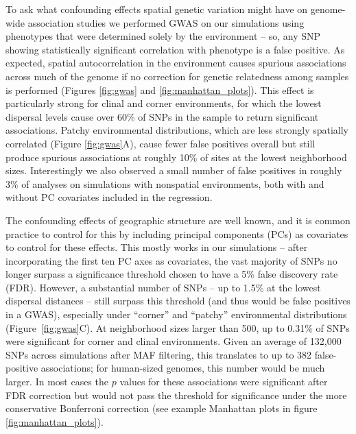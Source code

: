 \documentclass[10pt,twoside,lineno,hidelinks]{preprint}
\begin{document}
To ask what confounding effects spatial genetic variation might have on genome-wide association studies we performed GWAS on our simulations using phenotypes that were determined solely by the environment
-- so, any SNP showing statistically significant correlation with phenotype is a false positive. 
As expected, spatial autocorrelation in the environment causes spurious associations 
across much of the genome if no correction for genetic relatedness among samples is performed (Figures \ref{fig:gwas} and \ref{fig:manhattan_plots}). 
This effect is particularly strong for clinal and corner environments, 
for which the lowest dispersal levels cause over 60\% of SNPs in the sample to return significant associations. 
Patchy environmental distributions, which are less strongly spatially correlated (Figure \ref{fig:gwas}A), 
cause fewer false positives overall but still produce spurious associations at roughly 10\% of sites at the lowest neighborhood sizes. 
Interestingly we also observed a small number of false positives in roughly 3\% of analyses on simulations with nonspatial environments, both with and without PC covariates included in the regression.

The confounding effects of geographic structure are well known, 
and it is common practice to control for this by including principal components (PCs) as covariates to control for these effects.
This mostly works in our simulations -- after incorporating the first ten PC axes as covariates, the vast majority of SNPs no longer surpass a significance threshold chosen to have a 5\% false discovery rate (FDR).
However, a substantial number of SNPs -- up to 1.5\% at the lowest dispersal distances -- still surpass this threshold (and thus would be false positives in a GWAS),
especially under ``corner'' and ``patchy'' environmental distributions (Figure~\ref{fig:gwas}C). 
At neighborhood sizes larger than 500, up to 0.31\% of SNPs were significant for corner and clinal environments. 
Given an average of 132,000 SNPs across simulations after MAF filtering, this translates to up to 382 false-positive associations; for human-sized genomes, this number would be much larger.
In most cases the $p$ values for these associations were significant after FDR correction but would not pass the threshold for significance under the more conservative Bonferroni correction (see example Manhattan plots in figure \ref{fig:manhattan_plots}).
\end{document}
